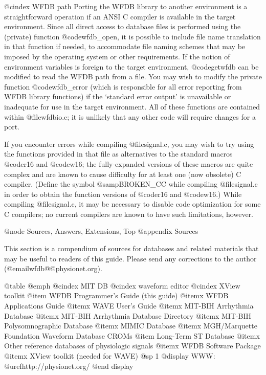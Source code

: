{{{{{{{{@cindex WFDB path
Porting the WFDB library to another environment is a straightforward
operation if an ANSI C compiler is available in the target environment.
Since all direct access to database files is performed using the
(private) function @code{wfdb_open}, it is possible to include file name
translation in that function if needed, to accommodate file naming
schemes that may be imposed by the operating system or other
requirements.  If the notion of environment variables is foreign to the
target environment, @code{getwfdb} can be modified to read the WFDB path
from a file.  You may wish to modify the private function
@code{wfdb_error} (which is responsible for all error reporting from WFDB
library functions) if the `standard error output' is unavailable or
inadequate for use in the target environment.  All of these functions are
contained within @file{wfdbio.c}; it is unlikely that any other code will
require changes for a port.

If you encounter errors while compiling @file{signal.c}, you may wish to try
using the functions provided in that file as alternatives to the standard
macros @code{r16} and @code{w16}; the fully-expanded versions of these macros
are quite complex and are known to cause difficulty for at least one (now
obsolete) C compiler.  (Define the symbol @samp{BROKEN_CC} while compiling
@file{signal.c} in order to obtain the function versions of @code{r16} and
@code{w16}.)  While compiling @file{signal.c}, it may be necessary to disable
code optimization for some C compilers;  no current compilers are known to
have such limitations, however.

@node     Sources, Answers, Extensions, Top
@appendix Sources

This section is a compendium of sources for databases and related
materials that may be useful to readers of this guide.  Please send any
corrections to the author (@email{wfdb@@physionet.org}).

@table @emph
@cindex MIT DB
@cindex waveform editor
@cindex XView toolkit
@item WFDB Programmer's Guide (this guide)
@itemx WFDB Applications Guide
@itemx WAVE User's Guide
@itemx MIT-BIH Arrhythmia Database
@itemx MIT-BIH Arrhythmia Database Directory
@itemx MIT-BIH Polysomnographic Database
@itemx MIMIC Database
@itemx MGH/Marquette Foundation Waveform Database CROMs
@item Long-Term ST Database
@itemx Other reference databases of physiologic signals
@itemx WFDB Software Package
@itemx XView toolkit (needed for WAVE)
@sp 1
@display
WWW: @uref{http://physionet.org/}
@end display

}}}}}}}}
